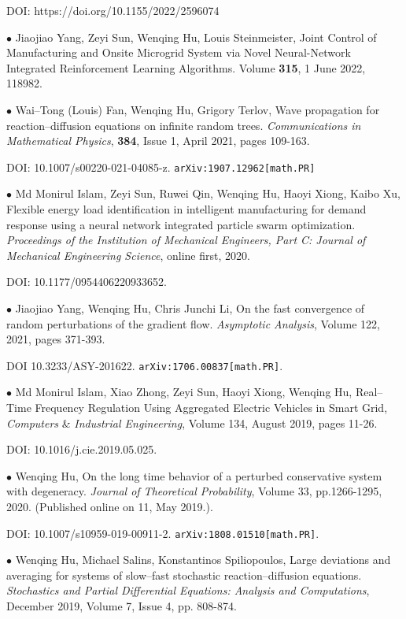 \documentclass[margin,line]{res}
\begin{document}
\begin{resume}
DOI: https://doi.org/10.1155/2022/2596074

$\bullet$ Jiaojiao Yang, Zeyi Sun, Wenqing Hu, Louis Steinmeister, 
Joint Control of Manufacturing and Onsite Microgrid System via Novel Neural-Network Integrated Reinforcement Learning Algorithms. 
Volume \textbf{315}, 1 June 2022, 118982.


$\bullet$ Wai--Tong (Louis) Fan, Wenqing Hu, Grigory Terlov, Wave propagation for reaction--diffusion equations on infinite random trees. \textit{Communications in Mathematical Physics}, \textbf{384}, Issue 1, April 2021, pages 109-163. 

DOI: 10.1007/s00220-021-04085-z. \verb"arXiv:1907.12962[math.PR]"

$\bullet$ Md Monirul Islam, Zeyi Sun, Ruwei Qin, Wenqing Hu, Haoyi Xiong, Kaibo Xu, Flexible energy load identification in intelligent manufacturing for demand response using a neural network integrated particle swarm optimization. \textit{Proceedings of the Institution of Mechanical Engineers, Part C: Journal of Mechanical Engineering Science}, online first, 2020.

DOI: 10.1177/0954406220933652. 

$\bullet$ Jiaojiao Yang, Wenqing Hu, Chris Junchi Li, On the fast convergence of random perturbations of the gradient flow. \textit{Asymptotic Analysis}, Volume 122, 2021, pages 371-393.

DOI 10.3233/ASY-201622. \verb"arXiv:1706.00837[math.PR]".

$\bullet$ Md Monirul Islam, Xiao Zhong, Zeyi Sun, Haoyi Xiong, Wenqing Hu, Real--Time Frequency Regulation Using Aggregated Electric Vehicles in Smart Grid, \textit{Computers} \& \textit{Industrial Engineering}, Volume 134, August 2019, pages 11-26.

DOI: 10.1016/j.cie.2019.05.025.


$\bullet$ Wenqing Hu, On the long time behavior of a perturbed conservative system with degeneracy.  
\textit{Journal of Theoretical Probability}, Volume 33, pp.1266-1295, 2020. (Published online on 11, May 2019.).

DOI: 10.1007/s10959-019-00911-2. \verb"arXiv:1808.01510[math.PR]".



$\bullet$ Wenqing Hu, Michael Salins, Konstantinos Spiliopoulos,
Large deviations and averaging for systems of slow--fast stochastic reaction--diffusion equations.
\textit{Stochastics and  Partial Differential Equations: Analysis and Computations}, December 2019, Volume 7, Issue 4, pp. 808-874.


\end{resume}
\end{document}
